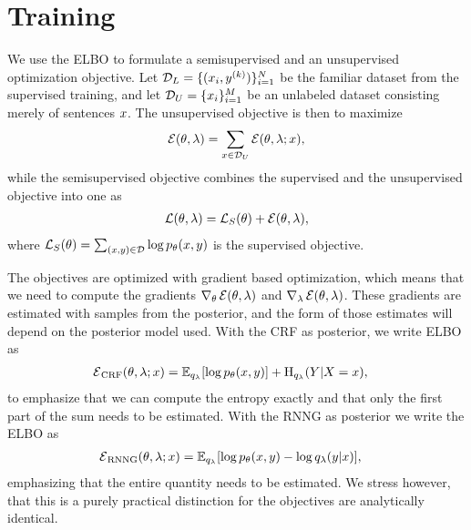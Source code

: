 \section{Training}
  We use the ELBO to formulate a semisupervised and an unsupervised optimization objective. Let $\mathcal{D}_L = \{ (x_i, y^{(k)})\}_{i=1}^N$ be the familiar dataset from the supervised training, and let $\mathcal{D}_U = \{ x_i \}_{i=1}^M$ be an unlabeled dataset consisting merely of sentences $x$. The unsupervised objective is then to maximize
  \begin{align}
    \operatorname{\mathcal{E}}(\theta, \lambda) = \sum_{ x \in \mathcal{D}_U } \operatorname{\mathcal{E}}(\theta, \lambda; x),
  \end{align}
  while the semisupervised objective combines the supervised and the unsupervised objective into one as
  \begin{align*}
    \operatorname{\mathcal{L}}(\theta, \lambda) = \operatorname{\mathcal{L}}_{S}(\theta) + \operatorname{\mathcal{E}}(\theta, \lambda),
  \end{align*}
  where $\operatorname{\mathcal{L}}_{S}(\theta) = \sum_{ (x, y) \in \mathcal{D} } \log p_{\theta}(x, y)$ is the supervised objective.

  The objectives are optimized with gradient based optimization, which means that we need to compute the gradients $\nabla_{\theta} \operatorname{\mathcal{E}}(\theta, \lambda)$ and $\nabla_{\lambda} \operatorname{\mathcal{E}}(\theta, \lambda)$. These gradients are estimated with samples from the posterior, and the form of those estimates will depend on the posterior model used. With the CRF as posterior, we write ELBO as
  \begin{align}
    \operatorname{\mathcal{E}}_{\text{CRF}}(\theta, \lambda; x)
      &= \operatorname{\mathbb{E}}_{q_{\lambda}} [ \log p_{\theta}( x, y ) ] + \operatorname{H}_{q_{\lambda}}(Y | X = x),
  \end{align}
  to emphasize that we can compute the entropy exactly and that only the first part of the sum needs to be estimated. With the RNNG as posterior we write the ELBO as
  \begin{align}
    \operatorname{\mathcal{E}}_{\text{RNNG}}(\theta, \lambda; x)
      &= \operatorname{\mathbb{E}}_{q_{\lambda}} [ \log p_{\theta}( x, y ) - \log q_{\lambda}(y | x) ],
  \end{align}
  emphasizing that the entire quantity needs to be estimated. We stress however, that this is a purely practical distinction for the objectives are analytically identical.

